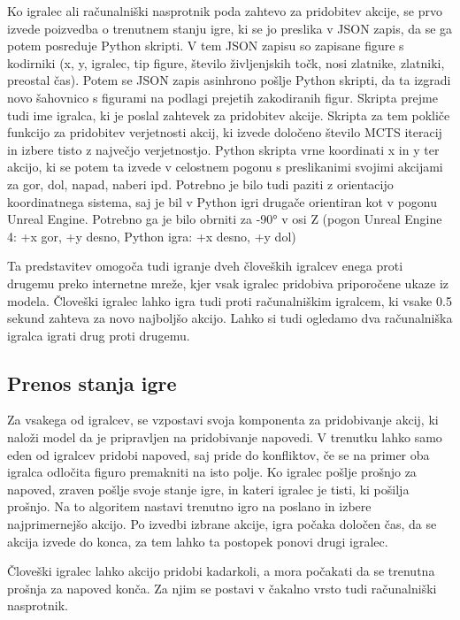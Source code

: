 \documentclass[a4paper, 12pt]{book}
\begin{document}
Ko igralec ali računalniški nasprotnik poda zahtevo za pridobitev akcije, se prvo izvede poizvedba o trenutnem stanju igre, ki se jo preslika v JSON zapis, da se ga potem posreduje Python skripti.
V tem JSON zapisu so zapisane figure s kodirniki (x, y, igralec, tip figure, število življenjskih točk, nosi zlatnike, zlatniki, preostal čas).
Potem se JSON zapis asinhrono pošlje Python skripti, da ta izgradi novo šahovnico s figurami na podlagi prejetih zakodiranih figur.
Skripta prejme tudi ime igralca, ki je poslal zahtevek za pridobitev akcije.
Skripta za tem pokliče funkcijo za pridobitev verjetnosti akcij, ki izvede določeno število MCTS iteracij in izbere tisto z največjo verjetnostjo.
Python skripta vrne koordinati x in y ter akcijo, ki se potem ta izvede v celostnem pogonu s preslikanimi svojimi akcijami za gor, dol, napad, naberi ipd.
Potrebno je bilo tudi paziti z orientacijo koordinatnega sistema, saj je bil v Python igri drugače orientiran kot v pogonu Unreal Engine. 
Potrebno ga je bilo obrniti za -90° v osi Z (pogon Unreal Engine 4: +x gor, +y desno, Python igra: +x desno, +y dol)

Ta predstavitev omogoča tudi igranje dveh človeških igralcev enega proti drugemu preko internetne mreže, kjer vsak igralec pridobiva priporočene ukaze iz modela.
Človeški igralec lahko igra tudi proti računalniškim igralcem, ki vsake 0.5 sekund zahteva za novo najboljšo akcijo.
Lahko si tudi ogledamo dva računalniška igralca igrati drug proti drugemu.

\subsection{Prenos stanja igre}
Za vsakega od igralcev, se vzpostavi svoja komponenta za pridobivanje akcij, ki naloži model da je pripravljen na pridobivanje napovedi.
V trenutku lahko samo eden od igralcev pridobi napoved, saj pride do konfliktov, če se na primer oba igralca odločita figuro premakniti na isto polje.
Ko igralec pošlje prošnjo za napoved, zraven pošlje svoje stanje igre, in kateri igralec je tisti, ki pošilja prošnjo.
Na to algoritem nastavi trenutno igro na poslano in izbere najprimernejšo akcijo.
Po izvedbi izbrane akcije, igra počaka določen čas, da se akcija izvede do konca, za tem lahko ta postopek ponovi drugi igralec.

Človeški igralec lahko akcijo pridobi kadarkoli, a mora počakati da se trenutna prošnja za napoved konča. Za njim se postavi v čakalno vrsto tudi računalniški nasprotnik.
\end{document}
